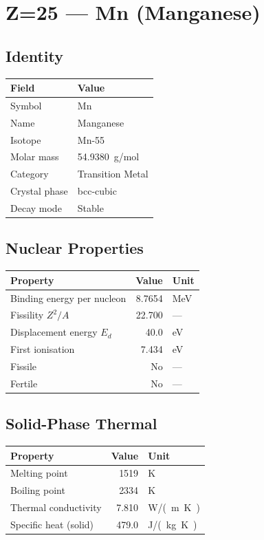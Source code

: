 \documentclass[11pt,a4paper]{article}
\begin{document}
\newpage

\section{Z=25 --- Mn (Manganese)}
\label{sec:Z25}

\subsection{Identity}
\begin{tabular}{ll}
  \toprule
  Field & Value \\
  \midrule
  Symbol & Mn \\
  Name & Manganese \\
  Isotope & Mn-55 \\
  Molar mass & \SI{54.9380}{g/mol} \\
  Category & Transition Metal \\
  Crystal phase & bcc-cubic \\
  Decay mode & Stable \\
  \bottomrule
\end{tabular}

\subsection{Nuclear Properties}
\begin{tabular}{lrl}
  \toprule
  Property & Value & Unit \\
  \midrule
  Binding energy per nucleon & 8.7654 & \si{MeV} \\
  Fissility $Z^2/A$ & 22.700 & --- \\
  Displacement energy $E_d$ & 40.0 & \si{eV} \\
  First ionisation & 7.434 & \si{eV} \\
  Fissile & No & --- \\
  Fertile & No & --- \\
  \bottomrule
\end{tabular}

\subsection{Solid-Phase Thermal}
\begin{tabular}{lrl}
  \toprule
  Property & Value & Unit \\
  \midrule
  Melting point & 1519 & \si{K} \\
  Boiling point & 2334 & \si{K} \\
  Thermal conductivity & 7.810 & \si{W/(m.K)} \\
  Specific heat (solid) & 479.0 & \si{J/(kg.K)} \\
  \bottomrule
\end{tabular}
\end{document}
